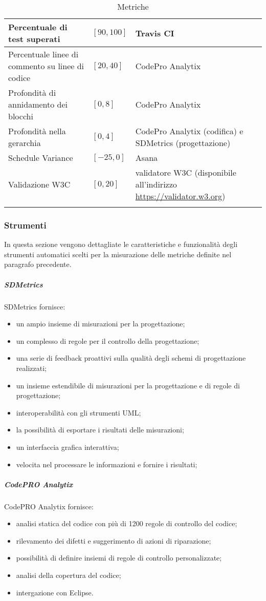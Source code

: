 \begin{longtable}{|p{}|p{}|p{}|}
	\hline 
	Percentuale di test superati &  $[90, 100]$ & Travis CI \\
	\hline 
	Percentuale linee di commento su linee di codice &  $[20, 40]$ &  CodePro Analytix \\
	\hline 
	Profondità di annidamento dei blocchi &  $[0, 8]$ &  CodePro Analytix \\
	\hline 
	Profondità nella gerarchia &  $[0, 4]$ &  CodePro Analytix (codifica) e SDMetrics (progettazione) \\
	\hline 
	Schedule Variance &  $[-25, 0]$ &  Asana \\
	\hline 
	Validazione W3C &  $[0, 20]$ &  validatore W3C (disponibile all'indirizzo \url{https://validator.w3.org}) \\
	\hline 
	\caption[Metriche]{Metriche}
	\label{tab:metriche}
	\end{longtable}

	\subsubsection{Strumenti}
	In questa sezione vengono dettagliate le caratteristiche e funzionalità degli strumenti automatici scelti per la misurazione delle metriche definite nel paragrafo precedente.
		\subparagraph{SDMetrics}
		SDMetrics fornisce:
		\begin{itemize}
			\item un ampio insieme di misurazioni per la progettazione;
			\item un complesso di regole per il controllo della progettazione;
			\item una serie di feedback proattivi sulla qualità degli schemi di progettazione realizzati;
			\item un insieme estendibile di misurazioni per la progettazione e di regole di progettazione;
			\item interoperabilità con gli strumenti UML;
			\item la possibilità di esportare i risultati delle misurazioni;
			\item un interfaccia grafica interattiva;
			\item velocita nel processare le informazioni e fornire i risultati;
		\end{itemize}

		\subparagraph{CodePRO Analytix}
		CodePRO Analytix fornisce:
		\begin{itemize}
			\item analisi statica del codice con più di 1200 regole di controllo del codice;
			\item rilevamento dei difetti e suggerimento di azioni di riparazione;
			\item possibilità di definire insiemi di regole di controllo personalizzate;
			\item analisi della copertura del codice;
			\item intergazione con Eclipse.
		\end{itemize}


